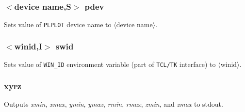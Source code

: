 \documentclass[a4paper,10pt]{report}
\begin{document}
\subsubsection{$<$device name,{\bf S}$>$ pdev}\label{sec:pdev}
Sets value of {\tt PLPLOT} device name to $\langle$device name$\rangle$.

\subsubsection{$<$winid,{\bf I}$>$ swid}\label{sec:swid}
Sets value of {\tt WIN\_ID} environment variable (part of {\tt TCL/TK} interface) to $\langle$winid$\rangle$.

\subsubsection{xyrz}\label{sec:xyrz}
Outputs {\em xmin}, {\em xmax}, {\em ymin}, {\em ymax}, {\em rmin}, {\em rmax}, {\em zmin}, and {\em zmax} to stdout.
\end{document}

